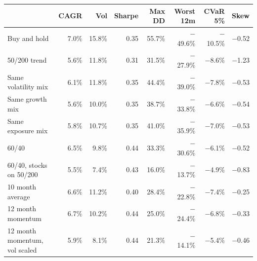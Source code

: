 \begin{tabular}{lrrrrrrr}
\toprule
 & CAGR & Vol & Sharpe & Max DD & Worst 12m & CVaR 5\% & Skew \\
\midrule
Buy and hold & 7.0\% & 15.8\% & 0.35 & 55.7\% & $-$49.6\% & $-$10.5\% & $-$0.52 \\
50/200 trend & 5.6\% & 11.8\% & 0.31 & 31.5\% & $-$27.9\% & $-$8.6\% & $-$1.23 \\
Same volatility mix & 6.1\% & 11.8\% & 0.35 & 44.4\% & $-$39.0\% & $-$7.8\% & $-$0.53 \\
Same growth mix & 5.6\% & 10.0\% & 0.35 & 38.7\% & $-$33.8\% & $-$6.6\% & $-$0.54 \\
Same exposure mix & 5.8\% & 10.7\% & 0.35 & 41.0\% & $-$35.9\% & $-$7.0\% & $-$0.53 \\
60/40 & 6.5\% & 9.8\% & 0.44 & 33.3\% & $-$30.6\% & $-$6.1\% & $-$0.52 \\
60/40, stocks on 50/200 & 5.5\% & 7.4\% & 0.43 & 16.0\% & $-$13.7\% & $-$4.9\% & $-$0.83 \\
10 month average & 6.6\% & 11.2\% & 0.40 & 28.4\% & $-$22.8\% & $-$7.4\% & $-$0.25 \\
12 month momentum & 6.7\% & 10.2\% & 0.44 & 25.0\% & $-$24.4\% & $-$6.8\% & $-$0.33 \\
12 month momentum, vol scaled & 5.9\% & 8.1\% & 0.44 & 21.3\% & $-$14.1\% & $-$5.4\% & $-$0.46 \\
\bottomrule
\end{tabular}
